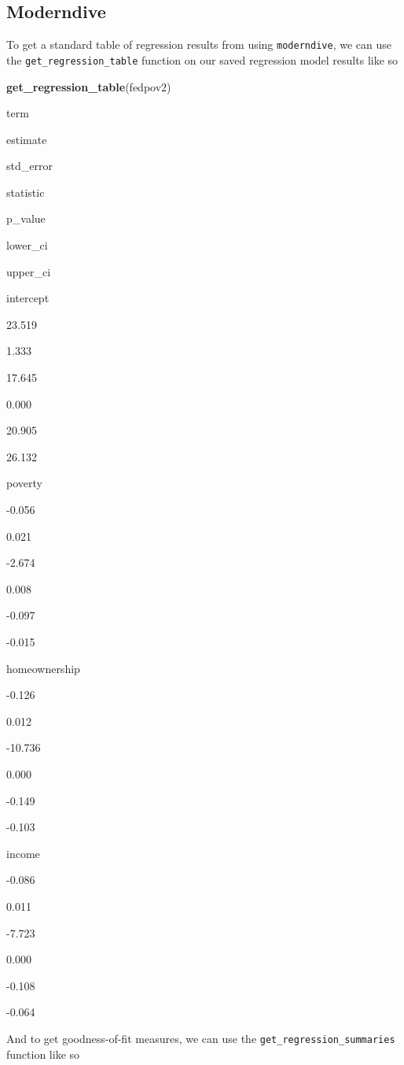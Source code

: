 \documentclass[
]{book}
\newenvironment{Shaded}{\begin{snugshade}}{\end{snugshade}}
\newcommand{\KeywordTok}[1]{\textcolor[rgb]{0.13,0.29,0.53}{\textbf{#1}}}
\newcommand{\NormalTok}[1]{#1}
\begin{document}
\hypertarget{moderndive}{%
\subsection{Moderndive}\label{moderndive}}

To get a standard table of regression results from using \texttt{moderndive}, we can use the \texttt{get\_regression\_table} function on our saved regression model results like so

\begin{Shaded}
\begin{Highlighting}[]
\KeywordTok{get_regression_table}\NormalTok{(fedpov2)}
\end{Highlighting}
\end{Shaded}

term

estimate

std\_error

statistic

p\_value

lower\_ci

upper\_ci

intercept

23.519

1.333

17.645

0.000

20.905

26.132

poverty

-0.056

0.021

-2.674

0.008

-0.097

-0.015

homeownership

-0.126

0.012

-10.736

0.000

-0.149

-0.103

income

-0.086

0.011

-7.723

0.000

-0.108

-0.064

And to get goodness-of-fit measures, we can use the \texttt{get\_regression\_summaries} function like so
\end{document}

